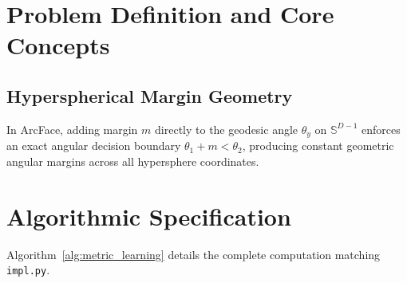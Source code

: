 \documentclass[11pt]{article}
\begin{document}
\section{Problem Definition and Core Concepts}
\label{sec:problem_definition}

\subsection{Hyperspherical Margin Geometry}
In ArcFace, adding margin $m$ directly to the geodesic angle $\theta_y$ on $\mathbb{S}^{D-1}$ enforces an exact angular decision boundary $\theta_1 + m < \theta_2$, producing constant geometric angular margins across all hypersphere coordinates.

\section{Algorithmic Specification}
\label{sec:algorithm}

Algorithm~\ref{alg:metric_learning} details the complete computation matching \texttt{impl.py}.
\end{document}
